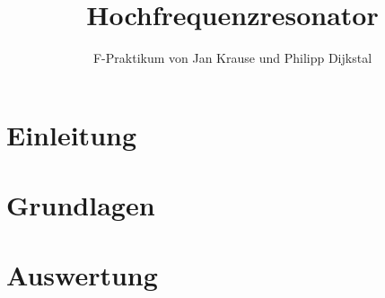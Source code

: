 \documentclass[10pt,article,colorback,accentcolor=tud9d]{scrartcl}
\title{Hochfrequenzresonator}
\subtitle{F-Praktikum von Jan Krause und Philipp Dijkstal}
\begin{document}
\maketitle

\tableofcontents

\newpage

\section{Einleitung}
\section{Grundlagen}
\section{Auswertung}
\end{document}

